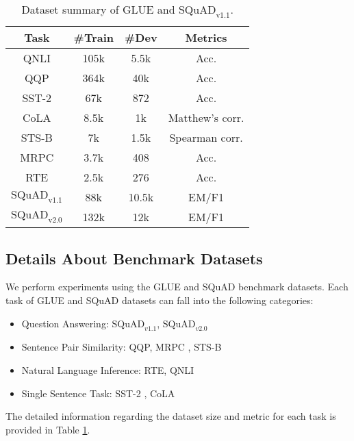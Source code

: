 \begin{table}[t!]
\begin{tabular}{cccc}
\toprule
Task & \#Train &  \#Dev  & Metrics \\
\hline \hline
QNLI & 105k & 5.5k & Acc. \\
QQP  & 364k & 40k  & Acc.\\
SST-2& 67k & 872  & Acc.\\
CoLA  & 8.5k & 1k  & Matthew's corr.\\
STS-B & 7k & 1.5k  & Spearman corr.\\
MRPC  & 3.7k & 408 & Acc.\\
RTE  & 2.5k & 276 & Acc. \\
$\text{SQuAD}_{\text{v1.1}}$  & 88k & 10.5k  & EM/F1\\
$\text{SQuAD}_{\text{v2.0}}$  & 132k & 12k  & EM/F1\\
\bottomrule
\end{tabular}
\centering
\caption{Dataset summary of GLUE and $\text{SQuAD}_{\text{v1.1}}$.}
\label{GLUE&SQuAD}
\end{table}


\subsection{Details About Benchmark Datasets}\label{app:gluedetail}
 
We perform experiments using the GLUE \cite{GLUE} and SQuAD \cite{SQuAD,SQuAD2} benchmark datasets.
Each task of GLUE and SQuAD datasets can fall into the following categories:
\begin{itemize}
    \item Question Answering: $\text{SQuAD}_{v1.1}$, $\text{SQuAD}_{v2.0}$
    \item Sentence Pair Similarity: QQP, MRPC \cite{MRPC}, STS-B \cite{STS-B}
    \item Natural Language Inference: RTE, QNLI
    \item Single Sentence Task: SST-2 \cite{SST-2}, CoLA \cite{CoLA}
\end{itemize}
The detailed information regarding the dataset size and metric for each task is provided in Table \ref{GLUE&SQuAD}.



